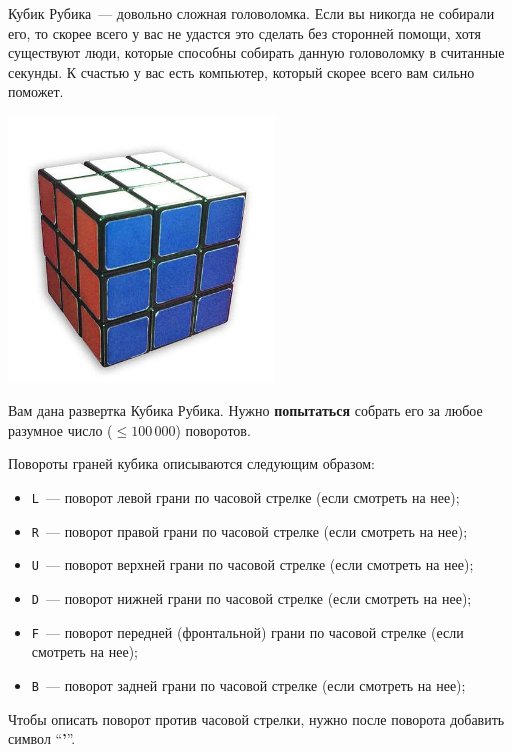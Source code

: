 
Кубик Рубика~--- довольно сложная головоломка. Если вы никогда не собирали его, то скорее всего у вас не удастся это сделать
без сторонней помощи, хотя существуют люди, которые способны собирать данную головоломку в считанные секунды. К счастью у вас
есть компьютер, который скорее всего вам сильно поможет.

\begin{center}
	\includegraphics[width=200pt,natwidth=680,natheight=544]{tasks/rubiks/statements/images/solved.jpg}
\end{center}

Вам дана развертка Кубика Рубика. Нужно \textbf{попытаться} собрать его за любое разумное число ($\le 100\,000$) поворотов.

Повороты граней кубика описываются следующим образом:

\begin{itemize}
    \item \texttt{L}~--- поворот левой грани по часовой стрелке (если смотреть на нее);
    \item \texttt{R}~--- поворот правой грани по часовой стрелке (если смотреть на нее);
    \item \texttt{U}~--- поворот верхней грани по часовой стрелке (если смотреть на нее);
    \item \texttt{D}~--- поворот нижней грани по часовой стрелке (если смотреть на нее);
    \item \texttt{F}~--- поворот передней (фронтальной) грани по часовой стрелке (если смотреть на нее);
    \item \texttt{B}~--- поворот задней грани по часовой стрелке (если смотреть на нее);
\end{itemize}

Чтобы описать поворот против часовой стрелки, нужно после поворота добавить символ ``\textbf{'}''.

